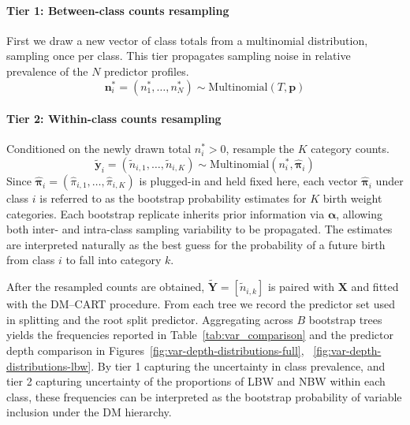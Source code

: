 \paragraph{Tier 1: Between-class counts resampling}
\label{para:tier-1}
First we draw a new vector of class totals from a multinomial distribution, sampling once per class. This tier propagates sampling noise in relative prevalence of the \(N\) predictor profiles.
\begin{equation}
    \label{eq:stage1}
    \mathbf{n}_i^\ast = (n_1^\ast, \dots, n_N^\ast) \sim \mathrm{Multinomial}(T, \mathbf{p})
    \end{equation}
\paragraph{Tier 2: Within-class counts resampling}
\label{para:tier-2}
Conditioned on the newly drawn total \(n_i^\ast > 0\), resample the \(K\) category counts. 
\begin{equation}
    \label{eq:stage2}
        \tilde{\mathbf{y}}_i = (\tilde{n}_{i,1}, \dots, \tilde{n}_{i,K}) \sim \mathrm{Multinomial}(n_i^\ast, \hat{\boldsymbol{\pi}}_i)
\end{equation}
Since \(\boldsymbol{\hat{\pi}}_i = (\hat{\pi}_{i,1}, \dots,\hat{\pi}_{i,K})\) is plugged-in and held fixed here, each vector \(\hat{\boldsymbol{\pi}}_i\) under class \(i\) is referred to as the bootstrap probability estimates for \(K\) birth weight categories. Each bootstrap replicate inherits prior information via \(\boldsymbol{\alpha}\), allowing both inter- and intra-class sampling variability to be propagated. The estimates are interpreted naturally as the best guess for the probability of a future birth from class \(i\) to fall into category \(k\). 

After the resampled counts are obtained, \(\tilde{\mathbf Y} =[\tilde n_{i,k}]\) is paired with \(\mathbf{X}\) and fitted with the DM–CART procedure.  From each tree we record the predictor set used in splitting and the root split predictor. Aggregating across \(B\) bootstrap trees yields the frequencies reported in Table~\ref{tab:var_comparison} and the predictor depth comparison in Figures~\ref{fig:var-depth-distributions-full}, ~\ref{fig:var-depth-distributions-lbw}. By tier 1 capturing the uncertainty in class prevalence, and tier 2 capturing uncertainty of the proportions of LBW and NBW within each class, these frequencies can be interpreted as the bootstrap probability of variable inclusion under the DM hierarchy. 

